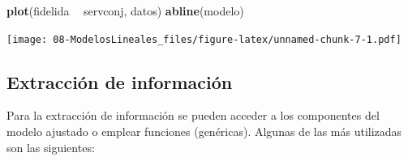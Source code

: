 \documentclass[]{book}
\newenvironment{Shaded}{\begin{snugshade}}{\end{snugshade}}
\newcommand{\KeywordTok}[1]{\textcolor[rgb]{0.13,0.29,0.53}{\textbf{#1}}}
\newcommand{\StringTok}[1]{\textcolor[rgb]{0.31,0.60,0.02}{#1}}
\newcommand{\OperatorTok}[1]{\textcolor[rgb]{0.81,0.36,0.00}{\textbf{#1}}}
\newcommand{\NormalTok}[1]{#1}
\begin{document}
\begin{Shaded}
\begin{Highlighting}[]
\KeywordTok{plot}\NormalTok{(fidelida }\OperatorTok{~}\StringTok{ }\NormalTok{servconj, datos)}
\KeywordTok{abline}\NormalTok{(modelo)}
\end{Highlighting}
\end{Shaded}

\texttt{[image: 08-ModelosLineales\_files/figure-latex/unnamed-chunk-7-1.pdf]}

\subsection{Extracción de información}\label{extraccion-de-informacion}

Para la extracción de información se pueden acceder a los componentes
del modelo ajustado o emplear funciones (genéricas). Algunas de las más
utilizadas son las siguientes:
\end{document}

